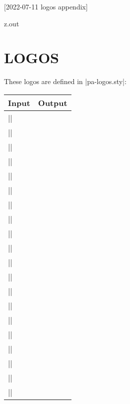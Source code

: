 [2022-07-11 logos appendix]

\begin{VerbatimOut}{z.out}
\chapter{LOGOS}

These logos are defined in |pa-logos.sty|:

\begin{inlinetable}
  \begin{tabular}{@{}ll@{}}
    \toprule
    \textbf{Input}& \textbf{Output}\\
    \midrule
    \noalign{\vspace{2pt}}
    |\AMSmathLogo|& \AMSmathLogo\\[2pt]
    |\BibLaTeXLogo|& \BibLaTeXLogo\\[2pt]
    |\BiberLogo|& \BiberLogo\\[2pt]
    |\CalligraphicAMSLaTeXLogo|& \CalligraphicAMSLaTeXLogo\\[2pt]
    |\CircuiTikZLogo|& \CircuiTikZLogo\\[2pt]
    |\CTANLogo|& \CTANLogo\\[2pt]
    |\LaTeXLogo|& \LaTeXLogo\\[2pt]
    |\LuaLaTeXLogo|& \LuaLaTeXLogo\\[2pt]
    |\METAFONTLogo|& \METAFONTLogo\\[2pt]
    |\METAPOSTLogo|& \METAPOSTLogo\\[2pt]
    |\MetaPostLogo|& \MetaPostLogo\\[2pt]
    |\NonCalligraphicAMSLaTeXLogo|& \NonCalligraphicAMSLaTeXLogo\\[2pt]
    |\PurdueThesisLogo|& \PurdueThesisLogo\\[2pt]
    |\PuThLogo|& \PuThLogo\\[2pt]
    |\siunitxLogo|& \siunitxLogo\\[2pt]
    |\TeXLogo|& \TeXLogo\\[2pt]
    |\TeXLiveLogo|& \TeXLiveLogo\\[2pt]
    |\TikZLogo|& \TikZLogo\\[2pt]
    |\TEXUsersGroupLogo|& \TeXUsersGroupLogo\\[2pt]
    |\TUGboatLogo|& \TUGboatLogo\\[2pt]
    \bottomrule
  \end{tabular}
\end{inlinetable}
\end{VerbatimOut}

\MyIO
